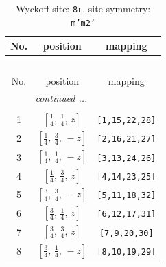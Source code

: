 \documentclass[fleqn,8pt]{jsarticle}
\begin{document}
\begin{longtable}{ccc}
\caption{Wyckoff site: {\tt 8r}, site symmetry: {\tt m'm2'}}
 \\
 \hline \hline
No. & position & mapping \\ \hline \endfirsthead

\multicolumn{2}{l}{\tablename\ \thetable{}} \\
 \hline \hline
No. & position & mapping \\ \hline \endhead

 \hline \hline
\multicolumn{2}{r}{\footnotesize\it continued ...} \\ \endfoot

 \hline \hline
\multicolumn{2}{r}{} \\ \endlastfoot

1 & $\left[ \frac{1}{4},\, \frac{1}{4},\, z \right]$ & {\tt [1,15,22,28]} \\ \hline
2 & $\left[ \frac{1}{4},\, \frac{3}{4},\, - z \right]$ & {\tt [2,16,21,27]} \\ \hline
3 & $\left[ \frac{1}{4},\, \frac{1}{4},\, - z \right]$ & {\tt [3,13,24,26]} \\ \hline
4 & $\left[ \frac{1}{4},\, \frac{3}{4},\, z \right]$ & {\tt [4,14,23,25]} \\ \hline
5 & $\left[ \frac{3}{4},\, \frac{3}{4},\, - z \right]$ & {\tt [5,11,18,32]} \\ \hline
6 & $\left[ \frac{3}{4},\, \frac{1}{4},\, z \right]$ & {\tt [6,12,17,31]} \\ \hline
7 & $\left[ \frac{3}{4},\, \frac{3}{4},\, z \right]$ & {\tt [7,9,20,30]} \\ \hline
8 & $\left[ \frac{3}{4},\, \frac{1}{4},\, - z \right]$ & {\tt [8,10,19,29]} \\
\end{longtable}
\renewcommand{\arraystretch}{1.2}
\end{document}
